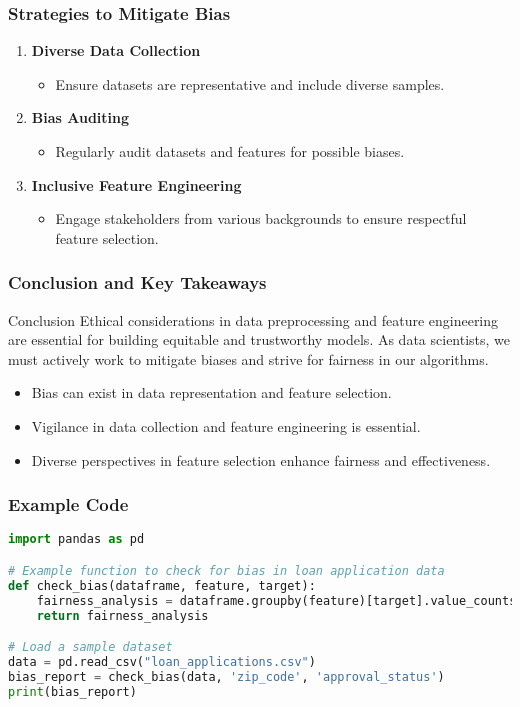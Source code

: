 \documentclass[aspectratio=169]{beamer}
\begin{document}
\begin{frame}
    \frametitle{Strategies to Mitigate Bias}
    \begin{enumerate}
        \item \textbf{Diverse Data Collection}
            \begin{itemize}
                \item Ensure datasets are representative and include diverse samples.
            \end{itemize}
        
        \item \textbf{Bias Auditing}
            \begin{itemize}
                \item Regularly audit datasets and features for possible biases. 
            \end{itemize}
        
        \item \textbf{Inclusive Feature Engineering}
            \begin{itemize}
                \item Engage stakeholders from various backgrounds to ensure respectful feature selection.
            \end{itemize}
    \end{enumerate}
\end{frame}

\begin{frame}
    \frametitle{Conclusion and Key Takeaways}
    \begin{block}{Conclusion}
        Ethical considerations in data preprocessing and feature engineering are essential for building equitable and trustworthy models. As data scientists, we must actively work to mitigate biases and strive for fairness in our algorithms.
    \end{block}
    
    \begin{itemize}
        \item Bias can exist in data representation and feature selection.
        \item Vigilance in data collection and feature engineering is essential.
        \item Diverse perspectives in feature selection enhance fairness and effectiveness.
    \end{itemize}
\end{frame}

\begin{frame}[fragile]
    \frametitle{Example Code}
    \begin{lstlisting}[language=Python]
import pandas as pd

# Example function to check for bias in loan application data
def check_bias(dataframe, feature, target):
    fairness_analysis = dataframe.groupby(feature)[target].value_counts(normalize=True)
    return fairness_analysis

# Load a sample dataset
data = pd.read_csv("loan_applications.csv")
bias_report = check_bias(data, 'zip_code', 'approval_status')
print(bias_report)
    \end{lstlisting}
\end{frame}
\end{document}
